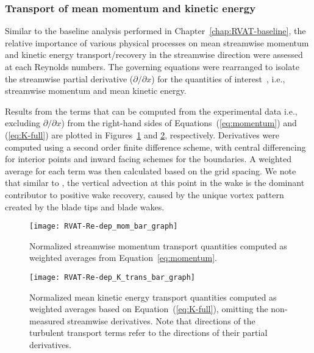 \subsubsection{Transport of mean momentum and kinetic energy}

Similar to the baseline analysis performed in Chapter~\ref{chap:RVAT-baseline},
the relative importance of various physical processes on mean streamwise
momentum and kinetic energy transport/recovery in the streamwise direction were
assessed at each Reynolds numbers. The governing equations were rearranged to
isolate the streamwise partial derivative ($\partial / \partial x$) for the
quantities of interest~\cite{Bachant2015-JoT}, i.e., streamwise momentum and
mean kinetic energy.

Results from the terms that can be computed from the experimental data i.e.,
excluding $\partial / \partial x$) from the right-hand sides of
Equations~(\ref{eq:momentum}) and (\ref{eq:K-full}) are plotted in
Figures~\ref{fig:RVAT-Re-dep-mom-bar-graph} and
\ref{fig:RVAT-Re-dep-K-bar-graph}, respectively. Derivatives were computed using
a second order finite difference scheme, with central differencing for interior
points and inward facing schemes for the boundaries. A weighted average for each
term was then calculated based on the grid spacing. We note that similar to
\cite{Bachant2015-JoT}, the vertical advection at this point in the wake is the
dominant contributor to positive wake recovery, caused by the unique vortex
pattern created by the blade tips and blade wakes.

\begin{figure}
    \centering
    
    \texttt{[image: RVAT-Re-dep\_mom\_bar\_graph]}
    
    \caption{Normalized streamwise momentum transport quantities computed as
        weighted averages from Equation~\ref{eq:momentum}.}
    
    \label{fig:RVAT-Re-dep-mom-bar-graph}
\end{figure}

\begin{figure}
    \centering
    
    \texttt{[image: RVAT-Re-dep\_K\_trans\_bar\_graph]}
    
    \caption{Normalized mean kinetic energy transport quantities computed as
        weighted averages based on Equation~(\ref{eq:K-full}), omitting the
        non-measured streamwise derivatives. Note that directions of the turbulent
        transport terms refer to the directions of their partial derivatives.}
    
    \label{fig:RVAT-Re-dep-K-bar-graph}
\end{figure}

